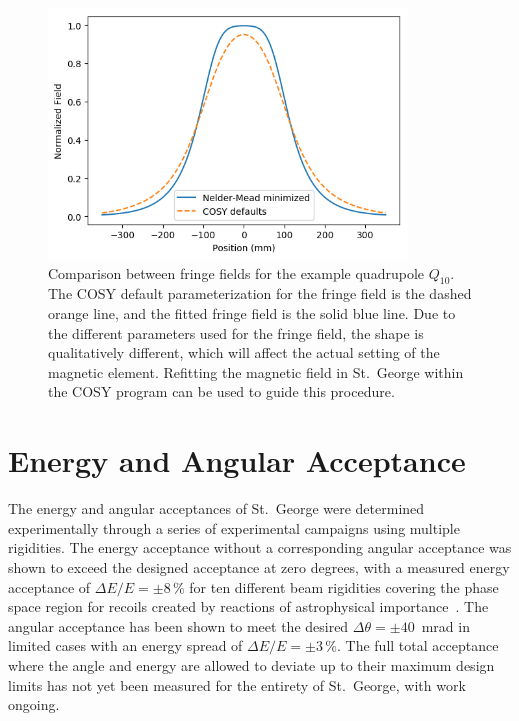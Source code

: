 \begin{figure}[h]
    \begin{center}
        \centerline{
            \includegraphics[width=0.85\textwidth]{figures/enge_comparison.png}}
        \caption[Comparison between fringe fields]{Comparison between
            fringe fields for the example quadrupole $Q_{10}$. The COSY
            default parameterization for the fringe field is the dashed
            orange line, and the fitted fringe field is the solid blue
            line. Due to the different parameters used for the fringe
            field, the shape is qualitatively different, which will
            affect the actual setting of the magnetic element. Refitting
            the magnetic field in St.\ George within the COSY program
            can be used to guide this procedure.}
        \label{fig:enge_comparison}
    \end{center}
\end{figure}

\section{Energy and Angular Acceptance}
\label{sec:commissioning}

The energy and angular acceptances of St.\ George were determined
experimentally through a series of experimental campaigns using multiple
rigidities. The energy acceptance without a corresponding angular
acceptance was shown to exceed the designed acceptance at zero degrees,
with a measured energy acceptance of $\Delta E/E = \pm 8$\,\% for ten
different beam rigidities covering the phase space region for recoils
created by reactions of astrophysical importance~\cite{Meisel2017}. The
angular acceptance has been shown to meet the desired
$\Delta\theta = \pm 40$~mrad in limited cases with an energy spread of
$\Delta E/E = \pm 3$\,\%. The full total acceptance where the angle and
energy are allowed to deviate up to their maximum design limits has not
yet been measured for the entirety of St.\ George, with work ongoing.

